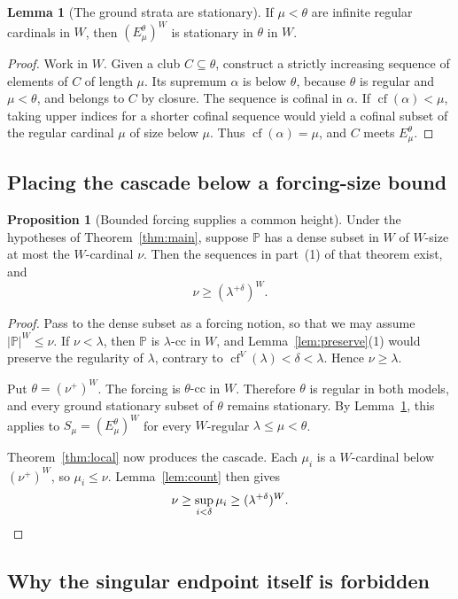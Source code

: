 \documentclass[11pt,letterpaper]{article}
\theoremstyle{definition}
\newtheorem{lemma}[definition]{Lemma}
\newtheorem{proposition}[definition]{Proposition}
\numberwithin{equation}{section}
\newcommand{\cf}{\operatorname{cf}}
\newcommand{\PP}{\mathbb P}
\newcommand{\cc}{\text{-cc}}
\begin{document}
\begin{lemma}[The ground strata are stationary]\label{lem:strata}
If $\mu<\theta$ are infinite regular cardinals in $W$, then $(E^\theta_\mu)^W$ is stationary in $\theta$ in $W$.
\end{lemma}
\begin{proof}
Work in $W$. Given a club $C\subseteq\theta$, construct a strictly increasing sequence of elements of $C$ of length $\mu$. Its supremum $\alpha$ is below $\theta$, because $\theta$ is regular and $\mu<\theta$, and belongs to $C$ by closure. The sequence is cofinal in $\alpha$. If $\cf(\alpha)<\mu$, taking upper indices for a shorter cofinal sequence would yield a cofinal subset of the regular cardinal $\mu$ of size below $\mu$. Thus $\cf(\alpha)=\mu$, and $C$ meets $E^\theta_\mu$.
\end{proof}

\subsection{Placing the cascade below a forcing-size bound}

\begin{proposition}[Bounded forcing supplies a common height]\label{prop:bounded}
Under the hypotheses of Theorem~\ref{thm:main}, suppose $\PP$ has a dense subset in $W$ of $W$-size at most the $W$-cardinal $\nu$. Then the sequences in part~(1) of that theorem exist, and
\[
\nu\ge(\lambda^{+\delta})^W.
\]
\end{proposition}
\begin{proof}
Pass to the dense subset as a forcing notion, so that we may assume $|\PP|^W\le\nu$. If $\nu<\lambda$, then $\PP$ is $\lambda\cc$ in $W$, and Lemma~\ref{lem:preserve}(1) would preserve the regularity of $\lambda$, contrary to $\cf^V(\lambda)<\delta<\lambda$. Hence $\nu\ge\lambda$.

Put $\theta=(\nu^+)^W$. The forcing is $\theta\cc$ in $W$. Therefore $\theta$ is regular in both models, and every ground stationary subset of $\theta$ remains stationary. By Lemma~\ref{lem:strata}, this applies to $S_\mu=(E^\theta_\mu)^W$ for every $W$-regular $\lambda\le\mu<\theta$.

Theorem~\ref{thm:local} now produces the cascade. Each $\mu_i$ is a $W$-cardinal below $(\nu^+)^W$, so $\mu_i\le\nu$. Lemma~\ref{lem:count} then gives
\[
\nu\ge\sup_{i<\delta}\mu_i\ge(\lambda^{+\delta})^W.\qedhere
\]
\end{proof}

\subsection{Why the singular endpoint itself is forbidden}
\end{document}
